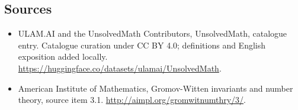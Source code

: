 \documentclass[11pt]{article}
\begin{document}
\subsection{Sources}
\begin{itemize}
\item[\hypertarget{source:statement:1}{S1}] ULAM.AI and the UnsolvedMath Contributors, UnsolvedMath, catalogue entry. Catalogue curation under CC BY 4.0; definitions and English exposition added locally.
\url{https://huggingface.co/datasets/ulamai/UnsolvedMath}.
\item[\hypertarget{source:statement:2}{S2}] American Institute of Mathematics, Gromov-Witten invariants and number theory, source item 3.1.
\url{http://aimpl.org/gromwitnumthry/3/}.
\end{itemize}
\label{end:statement}
\end{document}
